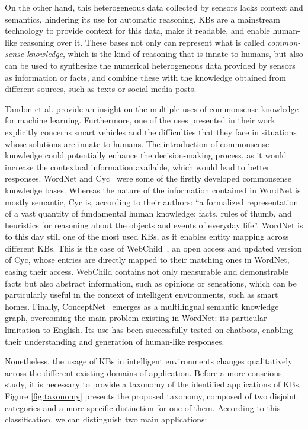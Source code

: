 On the other hand, this heterogeneous data collected by sensors lacks context and semantics, hindering its use for automatic reasoning. KBs are a mainstream technology to provide context for this data, make it readable, and enable human-like reasoning over it. These bases not only can represent what is called \textit{common-sense knowledge}, which is the kind of reasoning that is innate to humans, but also can be used to synthesize the numerical heterogeneous data provided by sensors as information or facts, and combine these with the knowledge obtained from different sources, such as texts or social media posts.

Tandon et al. \citep{Tandonetal} provide an insight on the multiple uses of commonsense knowledge for machine learning. Furthermore, one of the uses presented in their work explicitly concerns smart vehicles and the difficulties that they face in situations whose solutions are innate to humans. The introduction of commonsense knowledge could potentially enhance the decision-making process, as it would increase the contextual information available, which would lead to better responses. WordNet \citep{wordnet} and Cyc~\citep{cyckb} were some of the firstly developed commonsense knowledge bases. Whereas the nature of the information contained in WordNet is mostly semantic, Cyc is, according to their authors: ``a formalized representation of a vast quantity of fundamental human knowledge: facts, rules of thumb, and heuristics for reasoning about the objects and events of everyday life''. WordNet is to this day still one of the most used KBs, as it enables entity mapping across different KBs. This is the case of WebChild~\citep{webchild}, an open access and updated version of Cyc, whose entries are directly mapped to their matching ones in WordNet, easing their access. WebChild contains not only measurable and demonstrable facts but also abstract information, such as opinions or sensations, which can be particularly useful in the context of intelligent environments, such as smart homes. Finally, ConceptNet~\citep{conceptnet} emerges as a multilingual semantic knowledge graph, overcoming the main problem existing in WordNet: its particular limitation to English. Its use has been successfully tested on chatbots, enabling their understanding and generation of human-like responses. 

Nonetheless, the usage of KBs in intelligent environments changes qualitatively across the different existing domains of application. Before a more conscious study, it is necessary to provide a taxonomy of the identified applications of KBs. Figure \ref{fig:taxonomy} presents the proposed taxonomy, composed of two disjoint categories and a more specific distinction for one of them. According to this classification, we can distinguish two main applications: 

